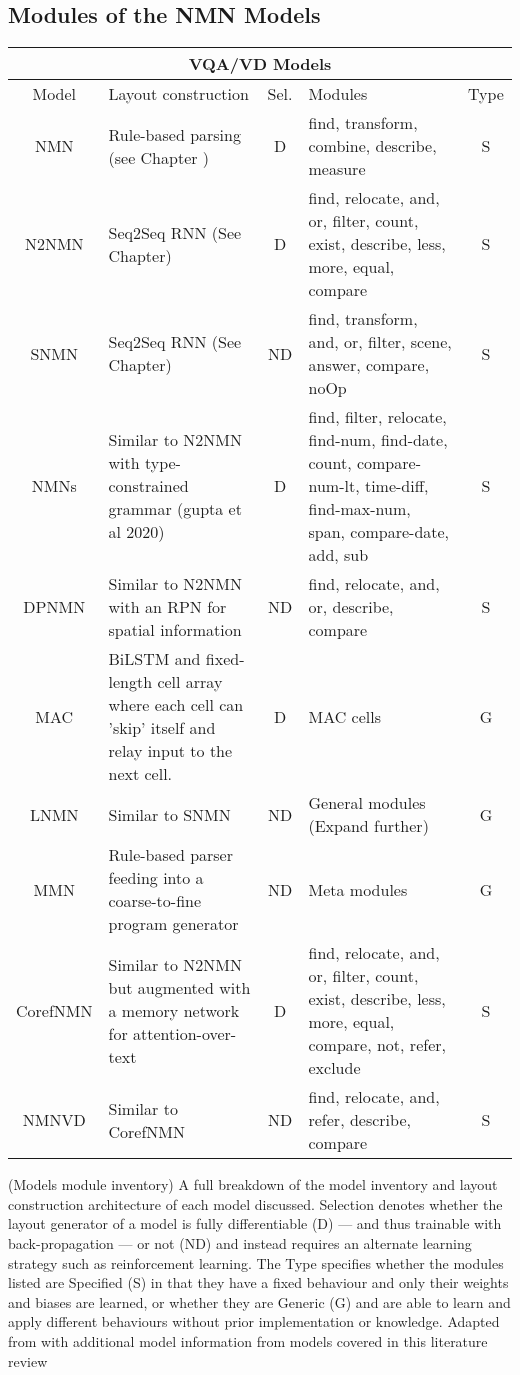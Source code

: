 \subsection{Modules of the NMN Models}
\label{subsec:modules_of_the_nmn_models}

\begin{table}[]
\begin{tabularx}{\linewidth}{cXcXc}
    \toprule
    \multicolumn{5}{c}{VQA/VD Models} \\ \midrule
    Model & Layout construction & Sel. & Modules & Type  \\
    NMN & Rule-based parsing (see Chapter ) & D & ﬁnd, transform, combine, describe, measure & S  \\
    N2NMN & Seq2Seq RNN (See Chapter) & D & ﬁnd, relocate, and, or, ﬁlter, count, exist, describe, less, more, equal, compare & S  \\
    SNMN & Seq2Seq RNN (See Chapter) & ND & ﬁnd, transform, and, or, ﬁlter, scene, answer, compare, noOp & S  \\
    NMNs & Similar to N2NMN with type-constrained grammar (gupta et al 2020) & D & find, filter, relocate, find-num, find-date, count, compare-num-lt, time-diff, find-max-num, span, compare-date, add, sub & S  \\
    DPNMN & Similar to N2NMN with an RPN for spatial information & ND & find, relocate, and, or, describe, compare & S  \\
    MAC & BiLSTM and fixed-length cell array where each cell can 'skip' itself and relay input to the next cell. & D & MAC cells & G  \\
    LNMN & Similar to SNMN & ND & General modules (Expand further) & G  \\
    MMN & Rule-based parser feeding into a coarse-to-fine program generator & ND & Meta modules & G  \\
    CorefNMN & Similar to N2NMN but augmented with a memory network for attention-over-text & D & find, relocate, and, or, filter, count, exist, describe, less, more, equal, compare, not, refer, exclude & S  \\
    NMNVD & Similar to CorefNMN & ND & find, relocate, and, refer, describe, compare & S  \\ \bottomrule
\end{tabularx}
\captionsource(Models module inventory)
    {A full breakdown of the model inventory and layout construction architecture of each model discussed. Selection denotes whether the layout generator of a model is fully differentiable (D) --- and thus trainable with back-propagation --- or not (ND) and instead requires an alternate learning strategy such as reinforcement learning. The Type specifies whether the modules listed are Specified (S) in that they have a fixed behaviour and only their weights and biases are learned, or whether they are Generic (G) and are able to learn and apply different behaviours without prior implementation or knowledge.\label{tab:models_module_inventory}}
    {Adapted from \citeauthor{fishandi_neural_2023}\cite{fishandi_neural_2023} with additional model information from models covered in this literature review}
\end{table}

